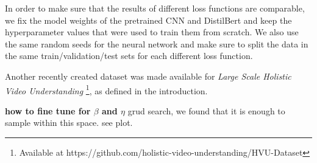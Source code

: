 In order to make sure that the results of different loss functions are comparable, we fix the model weights of the pretrained CNN and DistilBert and keep the hyperparameter values that were used to train them from scratch. We also use the same random seeds for the neural network and make sure to split the data in the same train/validation/test sets for each different loss function.


Another recently created dataset was made available for \emph{Large Scale Holistic Video Understanding} \cite{holisticVideoData} \footnote{Available at https://github.com/holistic-video-understanding/HVU-Dataset}, as defined in the introduction.

\textbf{how to fine tune for $\beta$ and $\eta$}
grud search, we found that it is enough to sample within this space. see plot.











